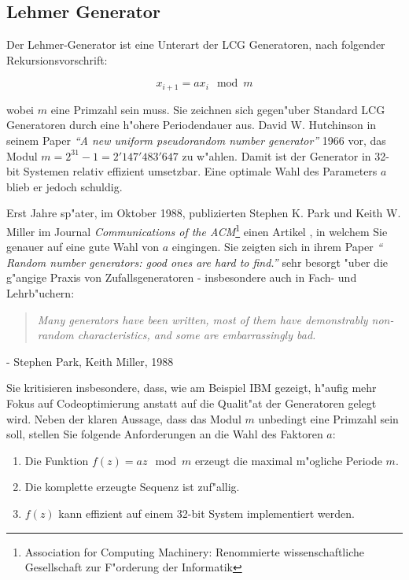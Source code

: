 \begin{refsection}
\subsection{Lehmer Generator} \label{subsec:Lehmer}
Der Lehmer-Generator ist eine Unterart der LCG Generatoren, nach folgender
Rekursionsvorschrift:

\begin{equation}
	x_{i+1} = a x_{i} \mod{m}
	\label{equ:lehmer}
\end{equation}

wobei $m$ eine Primzahl sein muss. Sie zeichnen sich gegen"uber Standard
LCG Generatoren durch eine h"ohere Periodendauer aus. David W. Hutchinson
in seinem Paper \textit{``A new uniform pseudorandom number generator''}
1966 \cite{rng:Hutchinson1966} vor, das Modul  $m = 2^{31} - 1 =
2'147'483'647$ zu w"ahlen. Damit ist der Generator in 32-bit Systemen
relativ effizient umsetzbar. Eine optimale Wahl des Parameters $a$
blieb er jedoch schuldig. 

Erst Jahre sp"ater, im Oktober 1988, publizierten Stephen K. Park
und Keith W. Miller im Journal \textit{Communications of the
ACM}\footnote{Association for Computing Machinery: Renommierte
wissenschaftliche Gesellschaft zur F"orderung der Informatik} einen
Artikel \cite{rng:ParkMiller1988}, in welchem Sie genauer auf eine
gute Wahl von $a$ eingingen. Sie zeigten sich in ihrem Paper \textit{``
Random number generators: good ones are hard to find.''} sehr besorgt
"uber die g"angige Praxis von Zufallsgeneratoren - insbesondere auch in
Fach- und Lehrb"uchern:

\begin{quote}
\textit{Many generators have been written, most of them have demonstrably
non-random characteristics, and some are embarrassingly bad.}
\end{quote}
\begin{flushright}
	- Stephen Park, Keith Miller, 1988 \cite{rng:ParkMiller1988}
\end{flushright}

Sie kritisieren insbesondere, dass, wie am Beispiel IBM gezeigt, h"aufig
mehr Fokus auf Codeoptimierung anstatt auf die Qualit"at der Generatoren
gelegt wird. Neben der klaren Aussage, dass das Modul $m$ unbedingt eine
Primzahl sein soll, stellen Sie folgende Anforderungen an die Wahl des
Faktoren $a$:

\begin{enumerate}
\item Die Funktion $f(z) = a z \mod m$ erzeugt die maximal m"ogliche Periode $m$.
\item Die komplette erzeugte Sequenz ist zuf"allig.
\item $f(z)$ kann effizient auf einem 32-bit System implementiert werden.
\end{enumerate}


\end{refsection}

